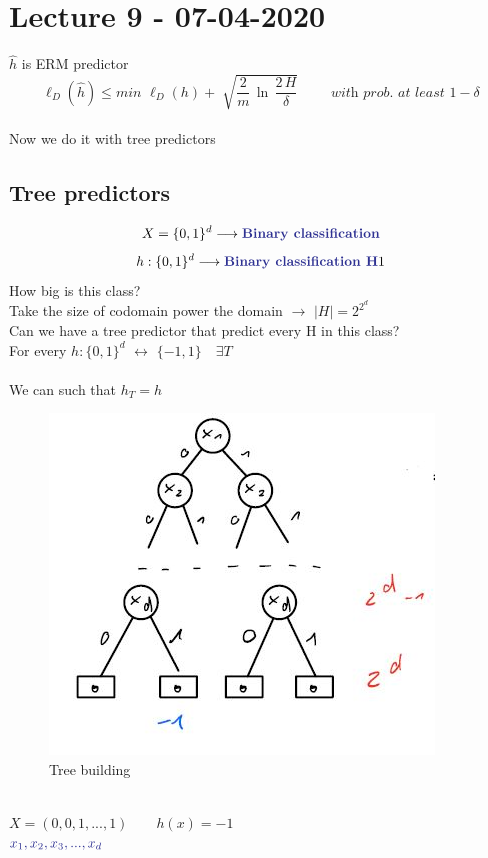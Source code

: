 \documentclass[../main.tex]{subfiles}
\begin{document}
\chapter{Lecture 9 - 07-04-2020}

$\hat{h}$  is ERM predictor
\\
$$
\ell_D\left(\hat{h}\right) \leq min \, \, \ell_D\left( h \right) + \sqrt[]{\frac{2}{m} \, \ln \, \frac{2 \, H}{\delta}} \qquad \textit{ with prob. at least $1-\delta$}
$$
\\
Now we do it with tree predictors\\
\section{Tree predictors}
$$
X  = \{ 0,1\}^d \longrightarrow \blue{Binary classification}
$$
$$
h : \{0, 1 \}^d \longrightarrow \blue{Binary classification H}1
$$
How big is this class? 
\\Take the size of codomain power the domain $\longrightarrow $ $|H| = 2^{2^d}$\\
Can we have a tree predictor that predict every H in this class?
\\
For every $ h : \{0,1\}^d$ $\longleftrightarrow$ $\{-1,1\} \quad \exists T$\\\\
We can  such that \quad $h_T = h$
\begin{figure}[h]
    \centering
    \includegraphics[width=0.6\linewidth]{../img/lez9-img1.JPG}
    \caption{Tree building}
\end{figure}\\
$ X = (0,0,1,...,1) \qquad h\left(x\right) = -1$ \\
$
\blue{$
x_1,x_2,x_3,...,x_d$}
$
\\\\
\end{document}
